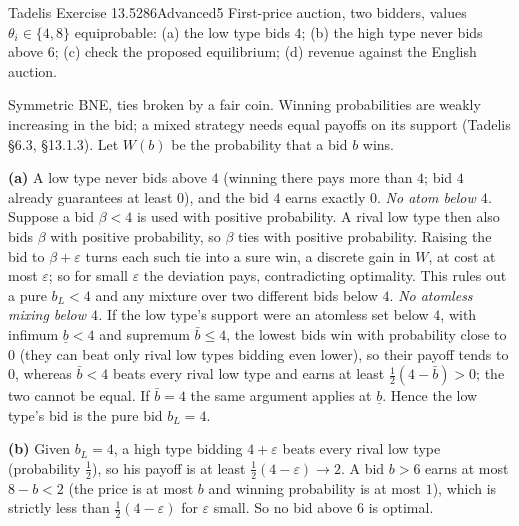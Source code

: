 \begin{exsol}{Tadelis Exercise 13.5}{286}{Advanced}{5}
\asked First-price auction, two bidders, values $\theta_i\in\{4,8\}$ equiprobable: (a) the low type
bids $4$; (b) the high type never bids above $6$; (c) check the proposed equilibrium; (d) revenue
against the English auction.

\method Symmetric BNE, ties broken by a fair coin. Winning probabilities are weakly increasing in
the bid; a mixed strategy needs equal payoffs on its support (Tadelis \S6.3, \S13.1.3).
Let $W(b)$ be the probability that a bid $b$ wins.

\solution
\textbf{(a)} A low type never bids above $4$ (winning there pays more than $4$; bid $4$ already
guarantees at least $0$), and the bid $4$ earns exactly $0$.
\emph{No atom below $4$.} Suppose a bid $\beta<4$ is used with positive probability. A rival low type
then also bids $\beta$ with positive probability, so $\beta$ ties with positive probability.
Raising the bid to $\beta+\varepsilon$ turns each such tie into a sure win, a discrete gain in $W$,
at cost at most $\varepsilon$; so for small $\varepsilon$ the deviation pays, contradicting optimality.
This rules out a pure $b_L<4$ and any mixture over two different bids below $4$.
\emph{No atomless mixing below $4$.} If the low type's support were an atomless set below $4$, with infimum
$\underline b<4$ and supremum $\bar b\le4$, the lowest bids win with probability close to $0$ (they can
beat only rival low types bidding even lower), so their payoff tends to $0$, whereas $\bar b<4$
beats every rival low type and earns at least $\tfrac12(4-\bar b)>0$; the two cannot be equal. If $\bar b=4$
the same argument applies at $\underline b$. Hence the low type's bid is the pure bid $b_L=4$.

\textbf{(b)} Given $b_L=4$, a high type bidding $4+\varepsilon$ beats every rival low type
(probability $\tfrac12$), so his payoff is at least $\tfrac12(4-\varepsilon)\to2$. A bid $b>6$ earns at most
$8-b<2$ (the price is at most $b$ and winning probability is at most $1$), which is strictly
less than $\tfrac12(4-\varepsilon)$ for $\varepsilon$ small. So no bid above $6$ is optimal.


\end{exsol}
